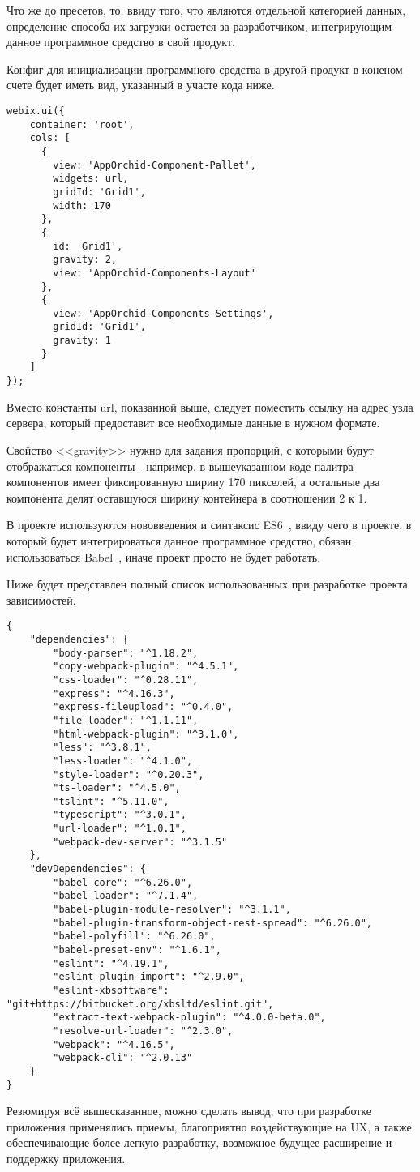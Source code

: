 Что же до пресетов, то, ввиду того, что являются отдельной категорией данных, определение способа их загрузки остается за разработчиком, интегрирующим данное программное средство в свой продукт.

Конфиг для инициализации программного средства в другой продукт в коненом счете будет иметь вид, указанный в участе кода ниже.

\begin{lstlisting}
webix.ui({
	container: 'root',
	cols: [
	  {
	    view: 'AppOrchid-Component-Pallet',
	    widgets: url,
	    gridId: 'Grid1',
	    width: 170
	  },
	  {
	    id: 'Grid1',
	    gravity: 2,
	    view: 'AppOrchid-Components-Layout'
	  },
	  {
	    view: 'AppOrchid-Components-Settings',
	    gridId: 'Grid1',
	    gravity: 1
	  }
	]
});
\end{lstlisting}

Вместо константы url, показанной выше, следует поместить ссылку на адрес узла сервера, который предоставит все необходимые данные в нужном формате.

Свойство <<gravity>> нужно для задания пропорций, с которыми будут отображаться компоненты - например, в вышеуказанном коде палитра компонентов имеет фиксированную ширину 170 пикселей, а остальные два компонента делят оставшуюся ширину контейнера в соотношении 2 к 1.

В проекте используются нововведения и синтаксис ES6~\cite{ecma_additional}, ввиду чего в проекте, в который будет интегрироваться данное программное средство, обязан использоваться Babel~\cite{babel}, иначе проект просто не будет работать. 

Ниже будет представлен полный список использованных при разработке проекта зависимостей. 

\begin{lstlisting}
{
	"dependencies": {
		"body-parser": "^1.18.2",
		"copy-webpack-plugin": "^4.5.1",
		"css-loader": "^0.28.11",
		"express": "^4.16.3",
		"express-fileupload": "^0.4.0",
		"file-loader": "^1.1.11",
		"html-webpack-plugin": "^3.1.0",
		"less": "^3.8.1",
		"less-loader": "^4.1.0",
		"style-loader": "^0.20.3",
		"ts-loader": "^4.5.0",
		"tslint": "^5.11.0",
		"typescript": "^3.0.1",
		"url-loader": "^1.0.1",
		"webpack-dev-server": "^3.1.5"
	},
	"devDependencies": {
		"babel-core": "^6.26.0",
		"babel-loader": "^7.1.4",
		"babel-plugin-module-resolver": "^3.1.1",
		"babel-plugin-transform-object-rest-spread": "^6.26.0",
		"babel-polyfill": "^6.26.0",
		"babel-preset-env": "^1.6.1",
		"eslint": "^4.19.1",
		"eslint-plugin-import": "^2.9.0",
		"eslint-xbsoftware": "git+https://bitbucket.org/xbsltd/eslint.git",
		"extract-text-webpack-plugin": "^4.0.0-beta.0",
		"resolve-url-loader": "^2.3.0",
		"webpack": "^4.16.5",
		"webpack-cli": "^2.0.13"
	}
}
\end{lstlisting}

Резюмируя всё вышесказанное, можно сделать вывод, что при разработке приложения применялись приемы, благоприятно воздействующие на UX, а также обеспечивающие более легкую разработку, возможное будущее расширение и поддержку приложения.